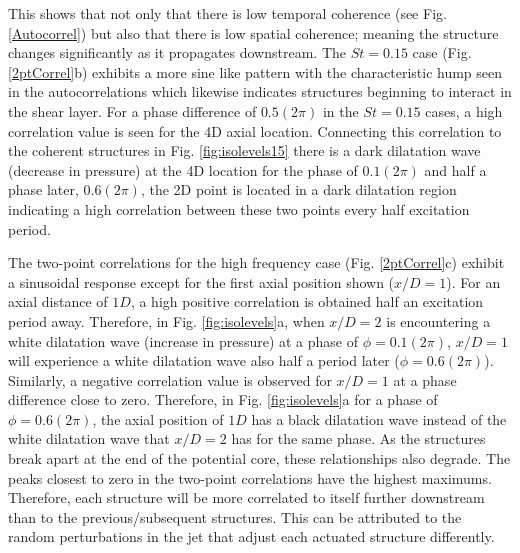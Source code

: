 \documentclass[english]{aiaa-tc}
\begin{document}
This shows that not only that there is low temporal coherence (see Fig. \ref{Autocorrel}) but also that there is low spatial coherence; meaning the structure changes significantly as it propagates downstream.
The $St=0.15$ case (Fig. \ref{2ptCorrel}b) exhibits a more sine like pattern with the characteristic hump seen in the autocorrelations which likewise indicates structures beginning to interact in the shear layer.
 For a phase difference of $0.5(2\pi)$ in the $St=0.15$ cases, a high correlation value is seen for the 4D axial location. Connecting this correlation to the coherent structures in Fig. \ref{fig:isolevels15} there is a dark dilatation wave (decrease in pressure) at the 4D location for the phase of $0.1(2\pi)$ and half a phase later, $0.6(2\pi)$, the 2D point is located in a dark dilatation region indicating a high correlation between these two points every half excitation period.

The two-point correlations for the high frequency case (Fig. \ref{2ptCorrel}c) exhibit a sinusoidal response except for the first axial position shown ($x/D=1$). For an axial distance of $1D$, a high positive correlation is obtained half an excitation period away.
Therefore, in Fig. \ref{fig:isolevels}a, when $x/D=2$ is encountering a white dilatation wave (increase in pressure) at a phase of $\phi=0.1(2\pi)$, $x/D=1$ will experience a white dilatation wave also half a period later ($\phi=0.6(2\pi)$). Similarly, a negative correlation value is observed for $x/D=1$ at a phase difference close to zero. Therefore, in Fig. \ref{fig:isolevels}a for a phase of $\phi=0.6(2\pi)$, the axial position of $1D$ has a black dilatation wave instead of the white dilatation wave that $x/D=2$ has for the same phase. As the structures break apart at the end of the potential core, these relationships also degrade.
The peaks closest to zero in the two-point correlations have the highest maximums. Therefore, each structure will be more correlated to itself further downstream than to the previous/subsequent structures. This can be attributed to the random perturbations in the jet that adjust each actuated structure differently.
\end{document}
